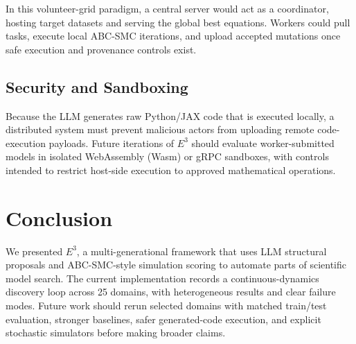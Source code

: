 In this volunteer-grid paradigm, a central server would act as a coordinator, hosting target datasets and serving the global best equations. Workers could pull tasks, execute local ABC-SMC iterations, and upload accepted mutations once safe execution and provenance controls exist.

\subsection{Security and Sandboxing}
Because the LLM generates raw Python/JAX code that is executed locally, a distributed system must prevent malicious actors from uploading remote code-execution payloads. Future iterations of $E^3$ should evaluate worker-submitted models in isolated WebAssembly (Wasm) or gRPC sandboxes, with controls intended to restrict host-side execution to approved mathematical operations.

\section{Conclusion}
\label{sec:conclusion}

We presented $E^3$, a multi-generational framework that uses LLM structural proposals and ABC-SMC-style simulation scoring to automate parts of scientific model search. The current implementation records a continuous-dynamics discovery loop across 25 domains, with heterogeneous results and clear failure modes. Future work should rerun selected domains with matched train/test evaluation, stronger baselines, safer generated-code execution, and explicit stochastic simulators before making broader claims.
